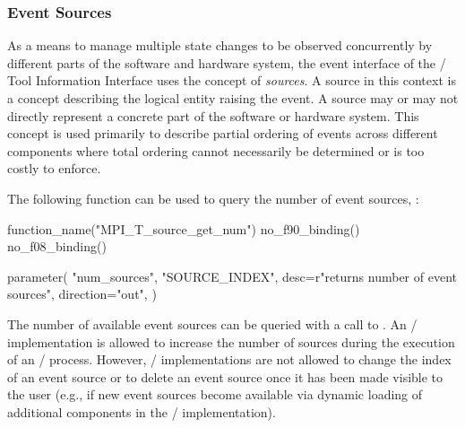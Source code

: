 \subsubsection{Event Sources}
\label{sec:tools:sources}

As a means to manage multiple state changes to be observed concurrently by
different parts of the software and hardware system, the event interface of
the \MPI/ Tool Information Interface uses the concept of \emph{sources}.  A
source in this context is a concept describing the logical entity raising
the event. A source may or may not directly represent a concrete part of
the software or hardware system. This concept is used primarily to describe
partial ordering of events across different components where total ordering
cannot necessarily be determined or is too costly to enforce. 

The following function can be used to query the number of event sources, :

\begin{mpi-binding}
    function_name("MPI_T_source_get_num")
    no_f90_binding()
    no_f08_binding()

    parameter(
        "num_sources",
        "SOURCE_INDEX",
        desc=r"returns number of event sources",
        direction="out",
    )
\end{mpi-binding}

The number of available event sources can be queried with a call to
.  An \MPI/ implementation is allowed to
increase the number of sources during the execution of an \MPI/ process.
However, \MPI/ implementations are not allowed to change the index of an
event source or to delete an event source once it has been made visible to
the user (e.g., if new event sources become available via dynamic loading
of additional components in the \MPI/ implementation).

